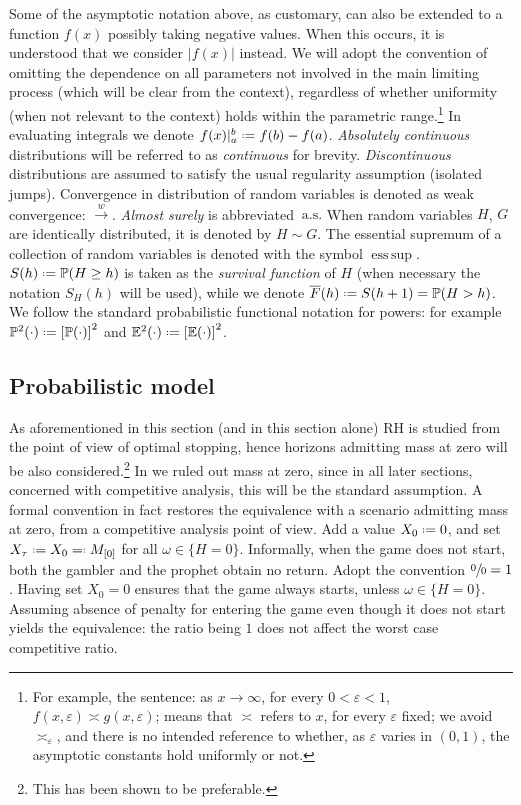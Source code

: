 \documentclass[11pt, a4paper, twoside]{article}
\newcommand*{\defeq}{\mathrel{\vcenter{\baselineskip0.5ex \lineskiplimit0pt
			\hbox{\scriptsize.}\hbox{\scriptsize.}}}=}
\newcommand*{\eqdef}{=\mathrel{\vcenter{\baselineskip0.5ex\lineskiplimit0pt
			\hbox{\scriptsize.}\hbox{\scriptsize.} }}}
\newcommand{\eps}{\varepsilon}
\newcommand{\EE}{\mathbb{E}}
\newcommand{\PP}{\mathbb{P}}
\newcommand{\as}{\:\text{a.s.}}
\DeclareMathOperator*{\esup}{ess\,sup} \DeclareMathOperator{\supp}{supp}
\numberwithin{equation}{section}
\begin{document}
	Some of the asymptotic notation above, as customary, can also be extended to a function $f(x)$ possibly taking negative values. When this occurs, it is understood that we consider $|f(x)|$ instead. We will adopt the convention of omitting the dependence on all parameters not involved in the main limiting process (which will be clear from the context), regardless of whether uniformity (when not relevant to the context) holds within the parametric range.\footnote{For example, the sentence: as $x\longrightarrow\infty$, for every $0<\eps<1$, $f(x,\eps)\asymp g(x,\eps)$; means that $\asymp$ refers to $x$, for every $\eps$ fixed; we avoid $\asymp_{\eps}$, and there is no intended reference to whether, as $\eps$ varies in $(0,1)$, the asymptotic constants hold uniformly or not.} In evaluating integrals we denote $f(x)\vert_a^b\defeq f(b)-f(a)$. \textit{Absolutely continuous} distributions will be referred to as \textit{continuous} for brevity. \textit{Discontinuous} distributions are assumed to satisfy the usual regularity assumption (isolated jumps). Convergence in distribution of random variables is denoted as weak convergence: $\overset{w}{\longrightarrow}$. \textit{Almost surely} is abbreviated $\as$ When random variables $H$, $G$ are identically distributed, it is denoted by $H\sim G$. The essential supremum of a collection of random variables is denoted with the symbol $\esup$. $S(h)\defeq \PP(H\ge h)$ is taken as the \textit{survival function} of $H$ (when necessary the notation $S_H(h)$ will be used), while we denote $\overline{F}(h)\defeq S(h+1)=\PP(H> h)$. We follow the standard probabilistic functional notation for powers: for example $\PP^2(\cdot)\defeq\left[\PP(\cdot)\right]^2$ and $\EE^2(\cdot)\defeq\left[\EE(\cdot)\right]^2$.

    \subsection{Probabilistic model}
	As aforementioned in this section (and in this section alone) RH is studied from the point of view of optimal stopping, hence horizons admitting mass at zero will be also considered.\footnote{This has been shown to be preferable\cite{Sam96}.} In  we ruled out mass at zero, since in all later sections, concerned with competitive analysis, this will be the standard assumption. A formal convention in fact restores the equivalence with a scenario admitting mass at zero, from a competitive analysis point of view. Add a value $X_0\defeq 0$, and set $X_\tau\defeq X_0\eqdef M_{[0]}$ for all $\omega\in\{H=0\}$. Informally, when the game does not start, both the gambler and the prophet obtain no return. Adopt the convention $\sfrac{0}{0}=1$. Having set $X_0=0$ ensures that the game always starts, unless $\omega\in\{H=0\}$. Assuming absence of penalty for entering the game even though it does not start yields the equivalence: the ratio being $1$ does not affect the worst case competitive ratio. 
\end{document}

